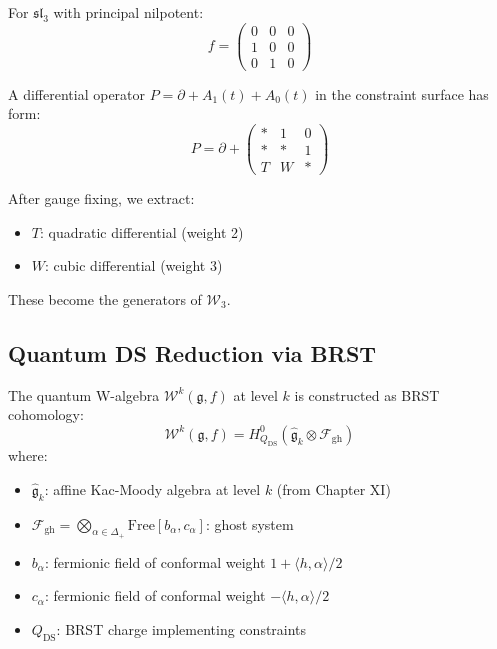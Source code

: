 \begin{example}
For $\mathfrak{sl}_3$ with principal nilpotent:
\begin{equation}
f = \begin{pmatrix} 0 & 0 & 0 \\ 1 & 0 & 0 \\ 0 & 1 & 0 \end{pmatrix}
\end{equation}

A differential operator $P = \partial + A_1(t) + A_0(t)$ in the constraint surface has form:
\begin{equation}
P = \partial + \begin{pmatrix} * & 1 & 0 \\ * & * & 1 \\ T & W & * \end{pmatrix}
\end{equation}

After gauge fixing, we extract:
\begin{itemize}
\item $T$: quadratic differential (weight 2)
\item $W$: cubic differential (weight 3)
\end{itemize}
These become the generators of $\mathcal{W}_3$.
\end{example}

\subsection{Quantum DS Reduction via BRST}

\begin{definition}\label{def:quantum-ds}
The quantum W-algebra $\mathcal{W}^k(\mathfrak{g}, f)$ at level $k$ is constructed as BRST cohomology:
\begin{equation}
\mathcal{W}^k(\mathfrak{g}, f) = H^0_{Q_{\text{DS}}}\left(\widehat{\mathfrak{g}}_k \otimes \mathcal{F}_{\text{gh}}\right)
\end{equation}
where:
\begin{itemize}
\item $\widehat{\mathfrak{g}}_k$: affine Kac-Moody algebra at level $k$ (from Chapter XI)
\item $\mathcal{F}_{\text{gh}} = \bigotimes_{\alpha \in \Delta_+} \text{Free}[b_\alpha, c_\alpha]$: ghost system
\item $b_\alpha$: fermionic field of conformal weight $1 + \langle h, \alpha \rangle/2$
\item $c_\alpha$: fermionic field of conformal weight $-\langle h, \alpha \rangle/2$
\item $Q_{\text{DS}}$: BRST charge implementing constraints
\end{itemize}
\end{definition}

